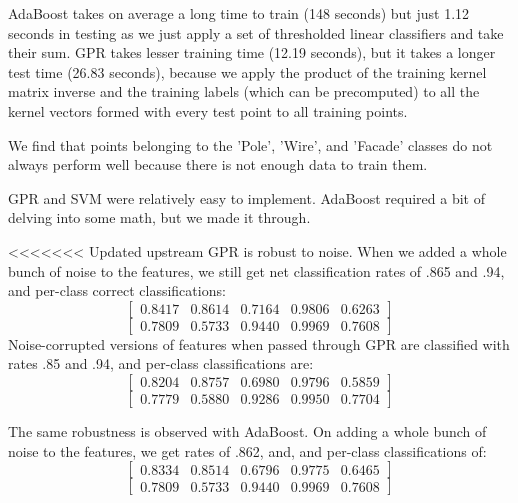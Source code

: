 \documentclass[letterpaper]{article}
\begin{document}
AdaBoost takes on average a long time to train (148 seconds) but just 1.12 seconds in testing as we just apply a set of thresholded linear classifiers and take their sum. GPR takes lesser training time (12.19 seconds), but it takes a longer test time (26.83 seconds), because we apply the product of the training kernel matrix inverse and the training labels (which can be precomputed) to all the kernel vectors formed with every test point to all training points.

We find that points belonging to the 'Pole', 'Wire', and 'Facade' classes do not always perform well because there is not enough data to train them.

GPR and SVM were relatively easy to implement. AdaBoost required a bit of delving into some math, but 
we made it through.

<<<<<<< Updated upstream
GPR is robust to noise. When we added a whole bunch of noise to the features, we still get net classification rates of .865 and .94, and per-class correct classifications:
$$\begin{bmatrix} 0.8417 &   0.8614 &   0.7164   & 0.9806  &  0.6263\end{bmatrix}$$
$$\begin{bmatrix} 0.7809  &  0.5733  &  0.9440&    0.9969    &0.7608\end{bmatrix}$$
Noise-corrupted versions of features when passed through GPR are classified with rates .85 and .94, and per-class classifications are:
$$\begin{bmatrix} 0.8204  &  0.8757 &   0.6980  &  0.9796 &   0.5859\end{bmatrix}$$
$$\begin{bmatrix} 0.7779  &  0.5880  &  0.9286  &  0.9950 &   0.7704\end{bmatrix}$$

The same robustness is observed with AdaBoost. On adding a whole bunch of noise to the features, we get rates of .862, and, and per-class classifications of:
$$\begin{bmatrix} 0.8334 &   0.8514 &   0.6796  & 0.9775  &  0.6465\end{bmatrix}$$
$$\begin{bmatrix} 0.7809  &  0.5733  &  0.9440&    0.9969    &0.7608\end{bmatrix}$$
\end{document}
